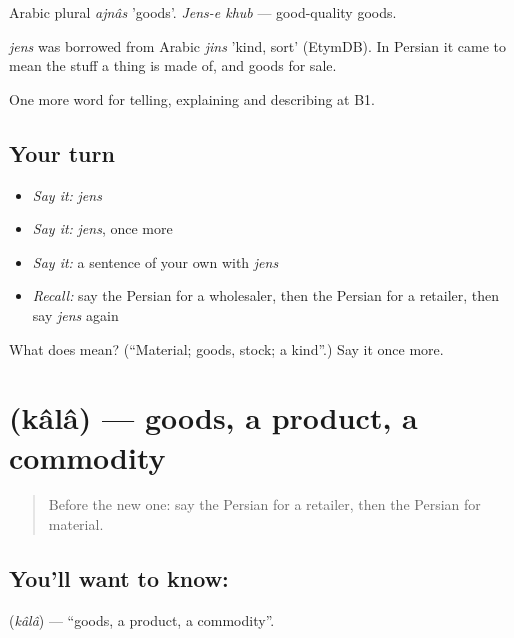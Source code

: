 Arabic plural \emph{ajnâs} 'goods'. \emph{Jens-e khub} — good-quality goods.

\begin{cousinweb}
\emph{jens} was borrowed from Arabic \emph{jins} 'kind, sort' (EtymDB). In Persian it came to mean the stuff a thing is made of, and goods for sale.
\end{cousinweb}

\begin{grammarlens}[title={What you've built}]
One more word for telling, explaining and describing at B1.
\end{grammarlens}

\subsection*{Your turn}
\begin{itemize}
\raggedright
  \item \emph{Say it:} \emph{jens}
  \item \emph{Say it:} \emph{jens}, once more
  \item \emph{Say it:} a sentence of your own with \emph{jens}
  \item \emph{Recall:} say the Persian for a wholesaler, then the Persian for a retailer, then say \emph{jens} again
\end{itemize}

\begin{tcolorbox}[breakable,colback=teal!4,colframe=teal!35!black,title={Before you move on}]
What does  mean? (\textquotedblleft{}Material; goods, stock; a kind\textquotedblright{}.) Say it once more.
\end{tcolorbox}
\section[\texorpdfstring{\fa{کالا} (kâlâ)}{کالا (kâlâ)}]{ (kâlâ) — goods, a product, a commodity}

\label{lesson:FA-C459-kala}



\begin{quote}
Before the new one: say the Persian for a retailer, then the Persian for material.
\end{quote}

\subsection*{You'll want to know: }
\textbf{} (\emph{kâlâ}) — \textquotedblleft{}goods, a product, a commodity\textquotedblright{}.


